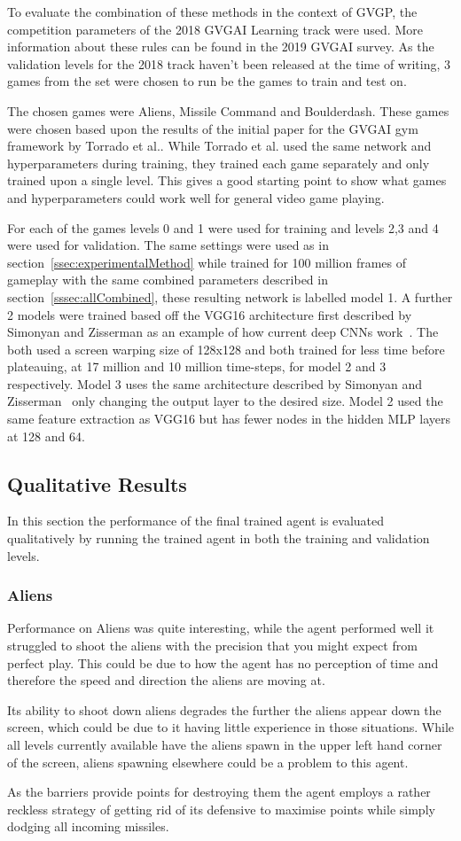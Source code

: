 To evaluate the combination of these methods in the context of GVGP, the competition parameters of the 2018 GVGAI Learning track were used.
More information about these rules can be found in the 2019 GVGAI survey\cite{GVGAI19}.
As the validation levels for the 2018 track haven't been released at the time of writing, 3 games from the set were chosen to run be the games to train and test on.
\par
The chosen games were Aliens, Missile Command and Boulderdash.
These games were chosen based upon the results of the initial paper for the GVGAI gym framework by Torrado et al.\cite{GVGAIGym}.
While Torrado et al. used the same network and hyperparameters during training, they trained each game separately and only trained upon a single level.
This gives a good starting point to show what games and hyperparameters could work well for general video game playing.
\par
For each of the games levels 0 and 1 were used for training and levels 2,3 and 4 were used for validation.
The same settings were used as in section~\ref{ssec:experimentalMethod} while trained for 100 million frames of gameplay with the same combined parameters described in section~\ref{sssec:allCombined}, these resulting network is labelled model 1.
A further 2 models were trained based off the VGG16 architecture first described by Simonyan and Zisserman as an example of how current deep CNNs work~\cite{VGG16}.
The both used a screen warping size of 128x128 and both trained for less time before plateauing, at 17 million and 10 million time-steps, for model 2 and 3 respectively.
Model 3 uses the same architecture described by Simonyan and Zisserman~\cite{VGG16} only changing the output layer to the desired size.
Model 2 used the same feature extraction as VGG16 but has fewer nodes in the hidden MLP layers at 128 and 64. 

\subsection{Qualitative Results}
In this section the performance of the final trained agent is evaluated qualitatively by running the trained agent in both the training and validation levels.
\subsubsection{Aliens}
Performance on Aliens was quite interesting, while the agent performed well it struggled to shoot the aliens with the precision that you might expect from perfect play.
This could be due to how the agent has no perception of time and therefore the speed and direction the aliens are moving at.
\par
Its ability to shoot down aliens degrades the further the aliens appear down the screen, which could be due to it having little experience in those situations.
While all levels currently available have the aliens spawn in the upper left hand corner of the screen, aliens spawning elsewhere could be a problem to this agent.
\par
As the barriers provide points for destroying them the agent employs a rather reckless strategy of getting rid of its defensive to maximise points while simply dodging all incoming missiles.
